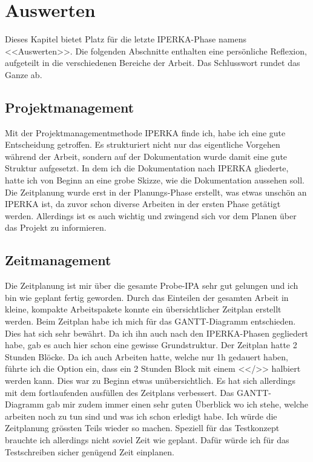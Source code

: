 \chapter{Auswerten}\label{ch:auswerten}
Dieses Kapitel bietet Platz für die letzte IPERKA-Phase namens <<Auswerten>>. Die folgenden Abschnitte enthalten eine persönliche Reflexion, aufgeteilt in die verschiedenen Bereiche der Arbeit. Das Schlusswort rundet das Ganze ab.
\section{Projektmanagement}
Mit der Projektmanagementmethode IPERKA finde ich, habe ich eine gute Entscheidung getroffen. Es strukturiert nicht nur das eigentliche Vorgehen während der Arbeit, sondern auf der Dokumentation wurde damit eine gute Struktur aufgesetzt. In dem ich die Dokumentation nach IPERKA gliederte, hatte ich von Beginn an eine grobe Skizze, wie die Dokumentation aussehen soll. Die Zeitplanung wurde erst in der Planungs-Phase erstellt, was etwas unschön an IPERKA ist, da zuvor schon diverse Arbeiten in der ersten Phase getätigt werden. Allerdings ist es auch wichtig und zwingend sich vor dem Planen über das Projekt zu informieren. 

\section{Zeitmanagement}
Die Zeitplanung ist mir über die gesamte Probe-IPA sehr gut gelungen und ich bin wie geplant fertig geworden. Durch das Einteilen der gesamten Arbeit in kleine, kompakte Arbeitspakete konnte ein übersichtlicher Zeitplan erstellt werden. Beim Zeitplan habe ich mich für das GANTT-Diagramm entschieden. Dies hat sich sehr bewährt. Da ich ihn auch nach den IPERKA-Phasen gegliedert habe, gab es auch hier schon eine gewisse Grundstruktur. Der Zeitplan hatte 2 Stunden Blöcke. Da ich auch Arbeiten hatte, welche nur 1h gedauert haben, führte ich die Option ein, dass ein 2 Stunden Block mit einem <</>> halbiert werden kann. Dies war zu Beginn etwas unübersichtlich. Es hat sich allerdings mit dem fortlaufenden ausfüllen des Zeitplans verbessert. Das GANTT-Diagramm gab mir zudem immer einen sehr guten Überblick wo ich stehe, welche arbeiten noch zu tun sind und was ich schon erledigt habe. Ich würde die Zeitplanung grössten Teils wieder so machen. Speziell für das Testkonzept brauchte ich allerdings nicht soviel Zeit wie geplant. Dafür würde ich für das Testschreiben sicher genügend Zeit einplanen. 
\newpage

